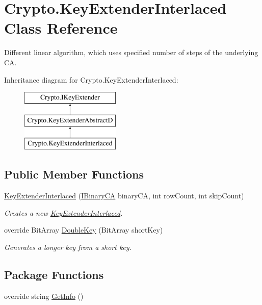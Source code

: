 \hypertarget{class_crypto_1_1_key_extender_interlaced}{}\section{Crypto.\+Key\+Extender\+Interlaced Class Reference}
\label{class_crypto_1_1_key_extender_interlaced}


Different linear algorithm, which uses specified number of steps of the underlying C\+A.  


Inheritance diagram for Crypto.\+Key\+Extender\+Interlaced\+:\begin{figure}[H]
\begin{center}
\leavevmode
\includegraphics[height=3.000000cm]{class_crypto_1_1_key_extender_interlaced}
\end{center}
\end{figure}
\subsection*{Public Member Functions}
\begin{DoxyCompactItemize}
\item 
\hyperlink{class_crypto_1_1_key_extender_interlaced_a00ed5af7a686d03b60fa8c3607c27d6b}{Key\+Extender\+Interlaced} (\hyperlink{interface_cellular_1_1_i_binary_c_a}{I\+Binary\+C\+A} binary\+C\+A, int row\+Count, int skip\+Count)
\begin{DoxyCompactList}\small\item\em Creates a new \hyperlink{class_crypto_1_1_key_extender_interlaced}{Key\+Extender\+Interlaced}. \end{DoxyCompactList}\item 
override Bit\+Array \hyperlink{class_crypto_1_1_key_extender_interlaced_a1caf1b3ad04b24305f964ab44a399751}{Double\+Key} (Bit\+Array short\+Key)
\begin{DoxyCompactList}\small\item\em Generates a longer key from a short key. \end{DoxyCompactList}\end{DoxyCompactItemize}
\subsection*{Package Functions}
\begin{DoxyCompactItemize}
\item 
override string \hyperlink{class_crypto_1_1_key_extender_interlaced_afa71a3be72036a121844b3e18c75ddd9}{Get\+Info} ()
\end{DoxyCompactItemize}


